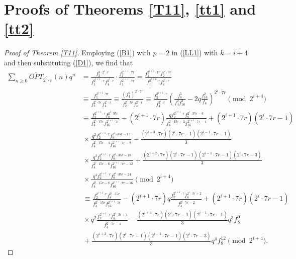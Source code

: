 \documentclass[12pt,reqno,a4paper]{amsart}
\numberwithin{equation}{section}
\begin{document}
 \section{Proofs of Theorems \ref{T11},  \ref{tt1} and \ref{tt2}}
\begin{proof}[Proof of Theorem \ref{T11}]
Employing (\ref{B1}) with $p=2$ in (\ref{LL1}) with $k=i+4$  and then substituting  (\ref{D1}), we find that
  \begin{align*}
        \sum_{n\geq 0}\overline{OPT}_{2^i\cdot r}(n)q^n&= \frac{f_2^{3\cdot 2^i\cdot r}}{f_1^{2^{i+1}\cdot r}f_4^{2^i\cdot r}}\cdot \frac{f_1^{2^{i+1}\cdot 7r}}{f_1^{2^{i+1}\cdot 7r}}= \frac{f_1^{2^{i+1}\cdot 7r}f_2^{2^i\cdot 3r}}{f_1^{2^{i+4}\cdot r}f_4^{2^i\cdot r}}\\
        & \equiv  \frac{f_1^{2^{i+1}\cdot 7r}}{f_2^{2^{i}\cdot 5r}f_4^{2^i\cdot r}}\equiv \frac{(f_1^2)^{2^i\cdot 7r}}{f_2^{2^{i}\cdot 5r}f_4^{2^i\cdot r}}
       \equiv \frac{f_2^{2^{i+1}\cdot r}}{f_4^{2^i\cdot r}}\left( \frac{f_8^5}{f_4^2f_{16}^2}-2q\frac{f_{16}^2}{f_8}\right)^{2^{i}\cdot 7r}\pmod{2^{i+4}}\\
    & \equiv \frac{f_2^{2^{i+1}\cdot r}f_8^{2^i\cdot 35r}}{f_4^{2^{i}\cdot 15r}f_{16}^{2^{i+1}\cdot 7r}}-(2^{i+1}\cdot 7r)\frac{qf_2^{2^{i+1}\cdot r}f_8^{2^i\cdot 35r-6}}{f_4^{2^{i}\cdot 15r-2}f_{16}^{2^{i+1}\cdot 7r-4}}+(2^{i+1}\cdot 7r)(2^i\cdot 7r-1)\\ 
     &~\times\frac{q^2f_2^{2^{i+1}\cdot r}f_8^{2^i\cdot 35r-12}}{f_4^{2^{i}\cdot 15r-4}f_{16}^{2^{i+1}\cdot 7r-8}}
             -\frac{(2^{i+3}\cdot 7r)(2^i\cdot 7r-1)
        (2^{i-1}\cdot 7r-1)}{3}\\&~\times\frac{q^3f_2^{2^{i+1}\cdot r}f_8^{2^i\cdot 35r-18}}{f_4^{2^{i}\cdot 15r-6}f_{16}^{2^{i+1}\cdot 7r-12}}+\frac{(2^{i+2}\cdot 7r)(2^i\cdot 7r-1)(2^{i-1}\cdot 7r-1)(2^i\cdot 7r-3)}{3}\\ &~\times\frac{q^4f_2^{2^{i+1}\cdot r}f_8^{2^i\cdot 35r-24}}{f_4^{2^{i}\cdot 15r-8}f_{16}^{2^{i+1}\cdot 7r-16}}\pmod{2^{i+4}}\\
         & ~\equiv \frac{f_2^{2^{i+1}\cdot r}f_8^{2^i\cdot 35r}}{f_4^{2^{i}\cdot 15r}f_{16}^{2^{i+1}\cdot 7r}}-(2^{i+1}\cdot 7r)q\frac{f_2^{2^{i+1}\cdot r}f_8^{2^i\cdot 3r+2}}{f_4^{2^i\cdot 7r-2}}+(2^{i+1}\cdot 7r)(2^i\cdot 7r-1)\\ &~\times q^2\frac{f_2^{2^{i+1}\cdot r}f_8^{2^i\cdot 3r+4}}{f_4^{2^i\cdot 7r-4}}
          -\frac{(2^{i+3}\cdot 7r)(2^i\cdot 7r-1)(2^{i-1}\cdot 7r-1)}{3}q^3f_8^{9}
        \\ &~+\frac{(2^{i+2}\cdot 7r)(2^i\cdot 7r-1)(2^{i-1}\cdot 7r-1)(2^i\cdot 7r-3)}{3}q^4f_8^{12}\pmod{2^{i+4}}.

\end{align*}
\end{proof}
\end{document}

